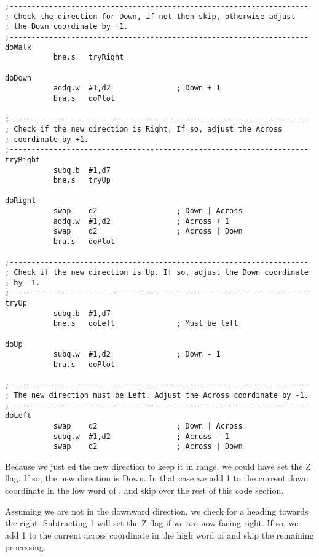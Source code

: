 \begin{lstlisting}[firstnumber=last,caption={Langtons Ant - Walk On}]
;--------------------------------------------------------------------
; Check the direction for Down, if not then skip, otherwise adjust
; the Down coordinate by +1.
;--------------------------------------------------------------------
doWalk
           bne.s   tryRight

doDown
           addq.w  #1,d2               ; Down + 1
           bra.s   doPlot

;--------------------------------------------------------------------
; Check if the new direction is Right. If so, adjust the Across 
; coordinate by +1.
;--------------------------------------------------------------------
tryRight
           subq.b  #1,d7
           bne.s   tryUp

doRight
           swap    d2                  ; Down | Across
           addq.w  #1,d2               ; Across + 1
           swap    d2                  ; Across | Down
           bra.s   doPlot

;--------------------------------------------------------------------
; Check if the new direction is Up. If so, adjust the Down coordinate
; by -1.
;--------------------------------------------------------------------
tryUp
           subq.b  #1,d7
           bne.s   doLeft              ; Must be left

doUp
           subq.w  #1,d2               ; Down - 1
           bra.s   doPlot

;--------------------------------------------------------------------
; The new direction must be Left. Adjust the Across coordinate by -1.
;--------------------------------------------------------------------
doLeft
           swap    d2                  ; Down | Across
           subq.w  #1,d2               ; Across - 1
           swap    d2                  ; Across | Down

\end{lstlisting}

Because we just ed the new direction to keep it in range, we could have set the Z flag. If so, the new direction is Down. In that case we add 1 to the current down coordinate in the low word of , and skip over the rest of this code section.

Assuming we are not in the downward direction, we check for a heading towards the right. Subtracting 1 will set the Z flag if we are now facing right. If so, we add 1 to the current across coordinate in the high word of  and skip the remaining processing.

